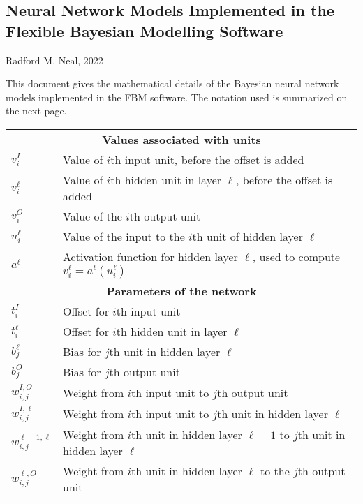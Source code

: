 \documentclass{report}[11pt]
\begin{document}
\subsection*{Neural Network Models Implemented in the Flexible
   Bayesian Modelling Software}

Radford M. Neal, 2022

This document gives the mathematical details of the Bayesian neural
network models implemented in the FBM software.  The notation used is
summarized on the next page.

\begin{table}[p]
\begin{center}\small
\begin{tabular}{ll}
%
  \multicolumn{2}{c}{\bf Values associated with units} \\[5pt]
%
  $v^I_i$            & Value of $i$th input unit, before the offset is 
                       added \\[3pt]
  $v^{\ell}_i$       & Value of $i$th hidden unit in layer $\ell$, before the  
                       offset is added \\[3pt]
  $v^O_i$            & Value of the $i$th output unit \\[10pt]

  $u^{\ell}_i$       & Value of the input to the $i$th unit of hidden
                       layer $\ell$ \\[3pt]
  $a^{\ell}$         & Activation function for hidden layer $\ell$, used
                       to compute $v^{\ell}_i = a^{\ell}(u^{\ell}_i)$\\[11pt]
%
  \multicolumn{2}{c}{\bf Parameters of the network} \\[5pt]
%
  $t^I_i$            & Offset for $i$th input unit \\[3pt]
  $t^\ell_i$         & Offset for $i$th hidden unit in layer $\ell$ \\[3pt]

  $b^{\ell}_j$       & Bias for $j$th unit in hidden layer $\ell$ \\[3pt]
  $b^O_j$            & Bias for $j$th output unit \\[10pt]

  $w^{I,O}_{i,j}$    & Weight from $i$th input unit to $j$th output unit \\[3pt]
  $w^{I,\ell}_{i,j}$ & Weight from $i$th input unit to $j$th unit in hidden
                       layer $\ell$ \\[3pt]
  $w^{\ell\!-\!1,\ell}_{i,j}$ & Weight from $i$th unit in hidden layer
                       $\ell\!-\!1$ to $j$th unit in hidden layer $\ell$ \\[3pt]
  $w^{\ell,O}_{i,j}$   & Weight from $i$th unit in hidden layer $\ell$ to the
                       $j$th output unit \\[10pt]


\end{tabular}
\end{center}
\end{table}
\end{document}
